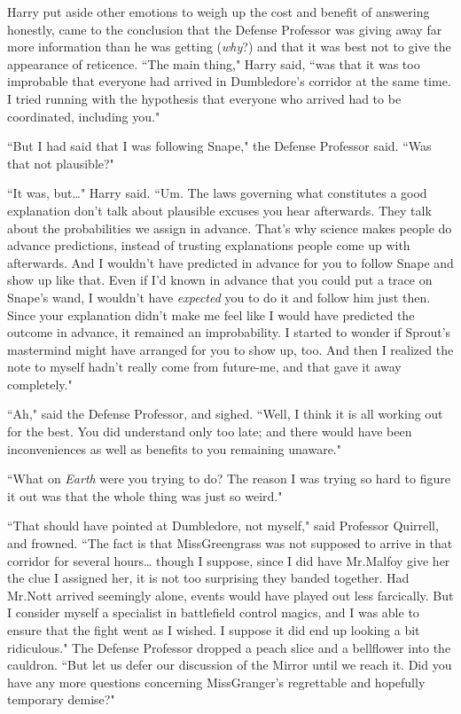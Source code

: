 Harry put aside other emotions to weigh up the cost and benefit of answering honestly, came to the conclusion that the Defense Professor was giving away far more information than he was getting (\emph{why}?) and that it was best not to give the appearance of reticence. ``The main thing," Harry said, ``was that it was too improbable that everyone had arrived in Dumbledore's corridor at the same time. I tried running with the hypothesis that everyone who arrived had to be coordinated, including you."

``But I had said that I was following Snape," the Defense Professor said. ``Was that not plausible?"

``It was, but{\ldots}" Harry said. ``Um. The laws governing what constitutes a good explanation don't talk about plausible excuses you hear afterwards. They talk about the probabilities we assign in advance. That's why science makes people do advance predictions, instead of trusting explanations people come up with afterwards. And I wouldn't have predicted in advance for you to follow Snape and show up like that. Even if I'd known in advance that you could put a trace on Snape's wand, I wouldn't have \emph{expected} you to do it and follow him just then. Since your explanation didn't make me feel like I would have predicted the outcome in advance, it remained an improbability. I started to wonder if Sprout's mastermind might have arranged for you to show up, too. And then I realized the note to myself hadn't really come from future-me, and that gave it away completely."

``Ah," said the Defense Professor, and sighed. ``Well, I think it is all working out for the best. You did understand only too late; and there would have been inconveniences as well as benefits to you remaining unaware."

``What on \emph{Earth} were you trying to do? The reason I was trying so hard to figure it out was that the whole thing was just so weird."

``That should have pointed at Dumbledore, not myself," said Professor Quirrell, and frowned. ``The fact is that Miss\?Greengrass was not supposed to arrive in that corridor for several hours{\ldots} though I suppose, since I did have Mr.\?Malfoy give her the clue I assigned her, it is not too surprising they banded together. Had Mr.\?Nott arrived seemingly alone, events would have played out less farcically. But I consider myself a specialist in battlefield control magics, and I was able to ensure that the fight went as I wished. I suppose it did end up looking a bit ridiculous." The Defense Professor dropped a peach slice and a bellflower into the cauldron. ``But let us defer our discussion of the Mirror until we reach it. Did you have any more questions concerning Miss\?Granger's regrettable and hopefully temporary demise?"

